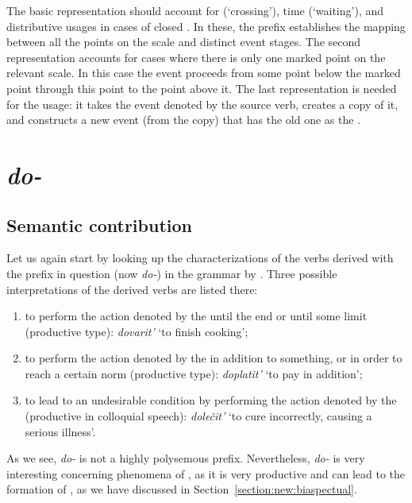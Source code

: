 The basic representation should account for  (`crossing'), time (`waiting'), and distributive usages in cases of closed . In these, the prefix establishes the mapping between all the points on the scale and distinct event stages. The second representation accounts for cases where there is only one marked point on the relevant scale. In this case the event proceeds from some point below the marked point through this point to the point above it. The last representation is needed for the  usage: it takes the event denoted by the source verb, creates a copy of it, and constructs a new event (from the copy) that has the old one as the .

\section{\textit{do-}}\label{subsection:semantics:do}
\subsection{Semantic contribution}
Let us again start by looking up the characterizations of the verbs derived with the prefix in question (now \textit{do-}) in the grammar by \citet[357--358]{Shvedova:82}. Three possible interpretations of the derived verbs are listed there:
\begin{enumerate}
\item to perform the action denoted by the  until the end or until some limit (productive type): \textit{dovarit'} `to finish cooking';
\item to perform the action denoted by the  in addition to something, or in order to reach a certain norm (productive type): \textit{doplatit'} `to pay in addition';
\item to lead to an undesirable condition by performing the action denoted by the  (productive in colloquial speech): \textit{dole\v{c}it'} `to cure incorrectly, causing a serious illness'.
\end{enumerate}

As we see, \textit{do-} is not a highly polysemous prefix. Nevertheless, \textit{do-} is very interesting concerning phenomena of , as it is very productive and can lead to the formation of , as we have discussed in Section~\ref{section:new:biaspectual}. 

